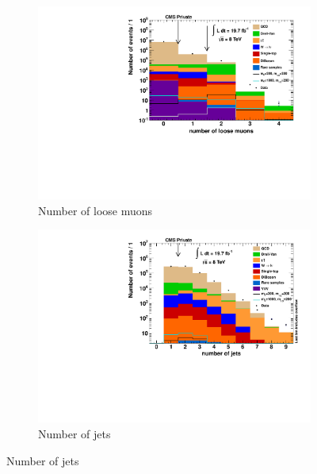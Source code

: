 \begin{figure}[!p]
  \centering
  \begin{subfigure}[b]{0.495\textwidth}
    \centering
    \includegraphics[width=\textwidth]{plots/nTL_nloose.pdf}
    \caption{Number of loose muons\label{fig:ntlnloose}}
  \end{subfigure}
  \begin{subfigure}[b]{0.495\textwidth}
    \centering
    \includegraphics[width=\textwidth]{plots/nTL_njets.pdf}
    \caption{Number of jets\label{fig:ntlnjets}}
  \end{subfigure}


\end{figure}
